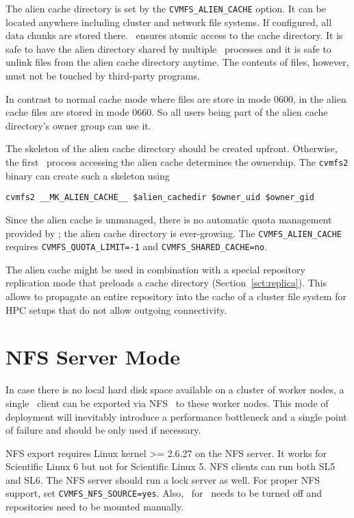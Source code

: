 The alien cache directory is set by the \texttt{CVMFS\_ALIEN\_CACHE} option.
It can be located anywhere including cluster and network file systems.
If configured, all data chunks are stored there.
\cvmfs\ ensures atomic access to the cache directory.
It is safe to have the alien directory shared by multiple \cvmfs\ processes and it is safe to unlink files from the alien cache directory anytime.
The contents of files, however, must not be touched by third-party programs.

In contrast to normal cache mode where files are store in mode 0600, in the alien cache files are stored in mode 0660.  
So all users being part of the alien cache directory's owner group can use it.

The skeleton of the alien cache directory should be created upfront.
Otherwise, the first \cvmfs\ process accessing the alien cache determines the ownership.
The \texttt{cvmfs2} binary can create such a skeleton using
\begin{verbatim}
cvmfs2 __MK_ALIEN_CACHE__ $alien_cachedir $owner_uid $owner_gid
\end{verbatim}

Since the alien cache is unmanaged, there is no automatic quota management provided by \cvmfs; the alien cache directory is ever-growing.
The \texttt{CVMFS\_ALIEN\_CACHE} requires \texttt{CVMFS\_QUOTA\_LIMIT=-1} and \texttt{CVMFS\_SHARED\_CACHE=no}.

The alien cache might be used in combination with a special repository replication mode that preloads a cache directory (\cf Section~\ref{sct:replica}).
This allows to propagate an entire repository into the cache of a cluster file system for HPC setups that do not allow outgoing connectivity.

\section{NFS Server Mode}
In case there is no local hard disk space available on a cluster of worker nodes, a single \cvmfs\ client can be exported via NFS~\cite{rfc1813,rfc3530} to these worker nodes.
This mode of deployment will inevitably introduce a performance bottleneck and a single point of failure and should be only used if necessary.

NFS export requires Linux kernel >= 2.6.27 on the NFS server.
It works for Scientific Linux 6 but not for Scientific Linux 5.
NFS clients can run both SL5 and SL6.
The NFS server should run a lock server as well.
For proper NFS support, set \texttt{CVMFS\_NFS\_SOURCE=yes}. 
Also, \autofs\ for \cvmfs\ needs to be turned off and repositories need to be mounted manually.

